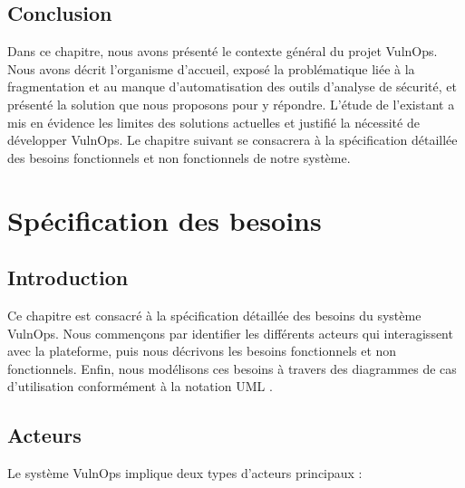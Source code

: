 \documentclass[12pt, a4paper, oneside]{report}
\begin{document}
\section*{Conclusion}

Dans ce chapitre, nous avons présenté le contexte général du projet VulnOps.
Nous avons décrit l'organisme d'accueil, exposé la problématique liée à la 
fragmentation et au manque d'automatisation des outils d'analyse de sécurité, 
et présenté la solution que nous proposons pour y répondre. L'étude de l'existant
a mis en évidence les limites des solutions actuelles et justifié la nécessité 
de développer VulnOps. Le chapitre suivant se consacrera à la spécification 
détaillée des besoins fonctionnels et non fonctionnels de notre système.

\chapter{Spécification des besoins}
\label{chap:besoins}

\section*{Introduction}

Ce chapitre est consacré à la spécification détaillée des besoins du système
VulnOps. Nous commençons par identifier les différents acteurs qui interagissent
avec la plateforme, puis nous décrivons les besoins fonctionnels et non fonctionnels.
Enfin, nous modélisons ces besoins à travers des diagrammes de cas d'utilisation
conformément à la notation UML \cite{umlspec}.

\section{Acteurs}
\label{sec:acteurs}

Le système VulnOps implique deux types d'acteurs principaux :
\end{document}
